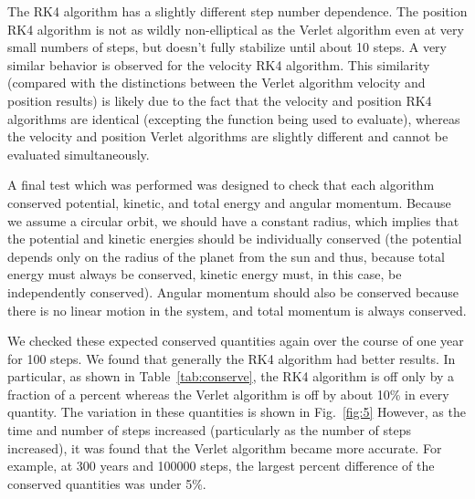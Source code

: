 \documentclass[12pt]{article}
\numberwithin{equation}{section}
\begin{document}
\par The RK4 algorithm has a slightly different step number dependence.  The position RK4 algorithm is not as wildly non-elliptical as the Verlet algorithm even at very small numbers of steps, but doesn't fully stabilize until about 10 steps.  A very similar behavior is observed for the velocity RK4 algorithm.  This similarity (compared with the distinctions between the Verlet algorithm velocity and position results) is likely due to the fact that the velocity and position RK4 algorithms are identical (excepting the function being used to evaluate), whereas the velocity and position Verlet algorithms are slightly different and cannot be evaluated simultaneously.
\par A final test which was performed was designed to check that each algorithm conserved potential, kinetic, and total energy and angular momentum.  Because we assume a circular orbit, we should have a constant radius, which implies that the potential and kinetic energies should be individually conserved (the potential depends only on the radius of the planet from the sun and thus, because total energy must always be conserved, kinetic energy must, in this case, be independently conserved).  Angular momentum should also be conserved because there is no linear motion in the system, and total momentum is always conserved.  
\par We checked these expected conserved quantities again over the course of one year for 100 steps.  We found that generally the RK4 algorithm had better results.  In particular, as shown in Table~\ref{tab:conserve}, the RK4 algorithm is off only by a fraction of a percent whereas the Verlet algorithm is off by about 10\% in every quantity. The variation in these quantities is shown in Fig.~\ref{fig:5}  However, as the time and number of steps increased (particularly as the number of steps increased), it was found that the Verlet algorithm became more accurate.  For example, at 300 years and 100000 steps, the largest percent difference of the conserved quantities was under 5\%.
\end{document}
